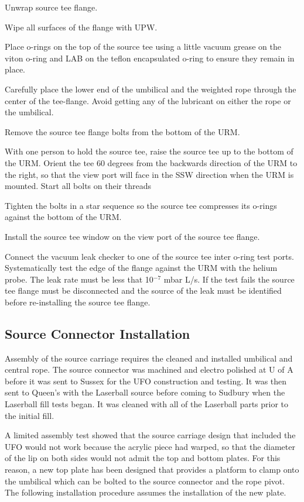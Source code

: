 \documentclass[11pt]{article}
\begin{document}
\begin{answerlist}
\item Unwrap source tee flange.
\item Wipe all surfaces of the flange with UPW.
\item Place o-rings on the top of the source tee using a little vacuum grease on the viton o-ring and LAB on the teflon encapsulated o-ring to ensure they remain in place.
\item Carefully place the lower end of the umbilical and the weighted rope through the center of the tee-flange. Avoid getting any of the lubricant on either the rope or the umbilical.
\item Remove the source tee flange bolts from the bottom of the URM.
\item With one person to hold the source tee, raise the source tee up
  to the bottom of the URM. Orient the tee 60 degrees from the
  backwards direction of the URM to the right, so that the view port
  will face in the SSW direction when the URM is mounted. Start all
  bolts on their threads
\item Tighten the bolts in a star sequence so the source tee compresses its o-rings against the bottom of the URM.
\item Install the source tee window on the view port of the source tee flange.
\item Connect the vacuum leak checker to one of the source tee inter
  o-ring test ports. Systematically test the edge of the flange
  against the URM with the helium probe. The leak rate must be less
  that 10$^{-7}$ mbar L/s. If the test fails the source tee flange
  must be disconnected and the source of the leak must be identified
  before re-installing the source tee flange.
\end{answerlist}

\subsection{Source Connector Installation}\label{ss:SourceConn}
Assembly of the source carriage requires the cleaned and installed
umbilical and central rope. The source connector was machined and
electro polished at U of A before it was sent to Sussex for the UFO
construction and testing. It was then sent to Queen's with the
Laserball source before coming to Sudbury when the Laserball fill
tests began. It was cleaned with all of the Laserball parts prior to
the initial fill.

A limited assembly test showed that the source carriage design that
included the UFO would not work because the acrylic piece had warped,
so that the diameter of the lip on both sides would not admit the top
and bottom plates. For this reason, a new top plate has been designed
that provides a platform to clamp onto the umbilical which can be
bolted to the source connector and the rope pivot. The following
installation procedure assumes the installation of the new plate.
\end{document}
